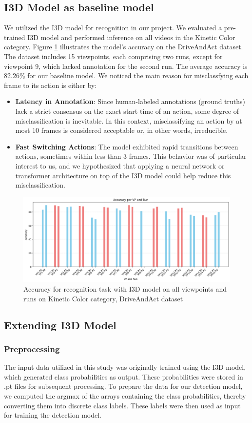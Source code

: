 \documentclass{article}
\begin{document}
\subsection{I3D Model as baseline model}
We utilized the I3D model for recognition in our project. We evaluated a pre-trained I3D model and performed inference on all videos in the Kinetic Color category. Figure \ref{fig:i3d-acc} illustrates the model's accuracy on the DriveAndAct dataset. The dataset includes 15 viewpoints, each comprising two runs, except for viewpoint 9, which lacked annotation for the second run. The average accuracy is 82.26\% for our baseline model.
We noticed the main reason for misclassfying each frame to its action is either by:
\begin{itemize}
    \item \textbf{Latency in Annotation}: Since human-labeled annotations (ground truths) lack a strict consensus on the exact start time of an action, some degree of misclassification is inevitable. In this context, misclassifying an action by at most 10 frames is considered acceptable or, in other words, irreducible.
    \item \textbf{Fast Switching Actions}: The model exhibited rapid transitions between actions, sometimes within less than 3 frames. This behavior was of particular interest to us, and we hypothesized that applying a neural network or transformer architecture on top of the I3D model could help reduce this misclassification.
\end{itemize}
\begin{figure}[h]
    \centering
    \includegraphics[width=0.8\linewidth]{i3d-acc.png}
    \caption{Accuracy for recognition task with I3D model on all viewpoints and runs on Kinetic Color category, DriveAndAct dataset}
    \label{fig:i3d-acc}
\end{figure}
\subsection{Extending I3D Model}
\subsubsection{Preprocessing}
The input data utilized in this study was originally trained using the I3D model, which generated class probabilities as output. These probabilities were stored in .pt files for subsequent processing. To prepare the data for our detection model, we computed the argmax of the arrays containing the class probabilities, thereby converting them into discrete class labels. These labels were then used as input for training the detection model.
\end{document}
